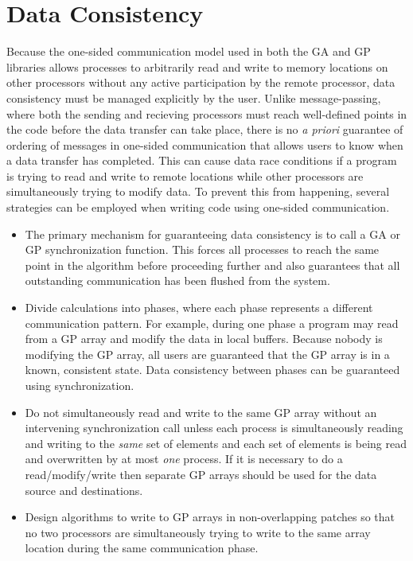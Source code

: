 \section{Data Consistency}

Because the one-sided communication model used in both the GA and GP libraries
allows processes to arbitrarily read and write to memory locations on other
processors without any active participation by the remote processor, data
consistency must be managed explicitly by the user. Unlike message-passing,
where both the sending and recieving processors must reach well-defined points
in the code before the data transfer can take place, there is no \emph{a priori}
guarantee of ordering of messages in one-sided communication that allows users
to know when a data transfer has completed. This can cause data race conditions
if a program is trying to read and write to remote locations while other
processors are simultaneously trying to modify data. To prevent this from
happening, several strategies can be employed when writing code using one-sided
communication.

\begin{itemize}

\item The primary mechanism for guaranteeing data consistency is to call a GA or
GP synchronization function. This forces all processes to reach the same point
in the algorithm before proceeding further and also guarantees that all
outstanding communication has been flushed from the system.

\item Divide calculations into phases, where each phase represents a different
communication pattern. For example, during one phase a program may read from a
GP array and modify the data in local buffers. Because nobody is modifying the
GP array, all users are guaranteed that the GP array is in a known, consistent
state. Data consistency between phases can be guaranteed using synchronization.

\item Do not simultaneously read and write to the same GP array without an
intervening synchronization call unless each process is simultaneously reading
and writing to the \emph{same} set of elements and each set of elements is being
read and overwritten by at most \emph{one} process. If it is necessary to do a
read/modify/write then separate GP arrays should be used for the data source and
destinations.

\item Design algorithms to write to GP arrays in non-overlapping patches so that
no two processors are simultaneously trying to write to the same array location
during the same communication phase.

\end{itemize}

